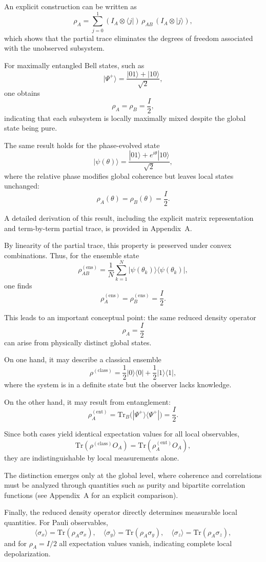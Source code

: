 \documentclass[a4paper]{article}
\begin{document}
An explicit construction can be written as
\[
\rho_A = \sum_{j=0}^{1} (I_A \otimes \langle j|)\,\rho_{AB}\,(I_A \otimes |j\rangle),
\]
which shows that the partial trace eliminates the degrees of freedom associated with the unobserved subsystem.

For maximally entangled Bell states, such as
\[
|\Psi^+\rangle = \frac{|01\rangle + |10\rangle}{\sqrt{2}},
\]
one obtains
\[
\rho_A = \rho_B = \frac{I}{2},
\]
indicating that each subsystem is locally maximally mixed despite the global state being pure.

The same result holds for the phase-evolved state
\[
|\psi(\theta)\rangle = \frac{|01\rangle + e^{i\theta}|10\rangle}{\sqrt{2}},
\]
where the relative phase modifies global coherence but leaves local states unchanged:
\[
\rho_A(\theta) = \rho_B(\theta) = \frac{I}{2}.
\]

A detailed derivation of this result, including the explicit matrix representation and term-by-term partial trace, is provided in Appendix~A.

By linearity of the partial trace, this property is preserved under convex combinations. Thus, for the ensemble state
\[
\rho_{AB}^{(\mathrm{ens})}
=
\frac{1}{N}
\sum_{k=1}^{N}
|\psi(\theta_k)\rangle\langle\psi(\theta_k)|,
\]
one finds
\[
\rho_A^{(\mathrm{ens})} = \rho_B^{(\mathrm{ens})} = \frac{I}{2}.
\]

This leads to an important conceptual point: the same reduced density operator
\[
\rho_A = \frac{I}{2}
\]
can arise from physically distinct global states.

On one hand, it may describe a classical ensemble
\[
\rho^{(\mathrm{class})}
=
\frac{1}{2}|0\rangle\langle 0|
+
\frac{1}{2}|1\rangle\langle 1|,
\]
where the system is in a definite state but the observer lacks knowledge.

On the other hand, it may result from entanglement:
\[
\rho_A^{(\mathrm{ent})}
=
\mathrm{Tr}_B\big(|\Psi^+\rangle\langle\Psi^+|\big)
=
\frac{I}{2}.
\]

Since both cases yield identical expectation values for all local observables,
\[
\mathrm{Tr}(\rho^{(\mathrm{class})} O_A)
=
\mathrm{Tr}(\rho_A^{(\mathrm{ent})} O_A),
\]
they are indistinguishable by local measurements alone.

The distinction emerges only at the global level, where coherence and correlations must be analyzed through quantities such as purity and bipartite correlation functions (see Appendix~A for an explicit comparison).

Finally, the reduced density operator directly determines measurable local quantities. For Pauli observables,
\[
\langle \sigma_x \rangle = \mathrm{Tr}(\rho_A \sigma_x), \quad
\langle \sigma_y \rangle = \mathrm{Tr}(\rho_A \sigma_y), \quad
\langle \sigma_z \rangle = \mathrm{Tr}(\rho_A \sigma_z),
\]
and for $\rho_A = I/2$ all expectation values vanish, indicating complete local depolarization.
\end{document}
